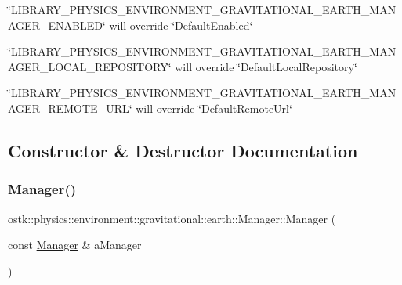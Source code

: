 \begin{DoxyItemize}
\item \char`\"{}\+L\+I\+B\+R\+A\+R\+Y\+\_\+\+P\+H\+Y\+S\+I\+C\+S\+\_\+\+E\+N\+V\+I\+R\+O\+N\+M\+E\+N\+T\+\_\+\+G\+R\+A\+V\+I\+T\+A\+T\+I\+O\+N\+A\+L\+\_\+\+E\+A\+R\+T\+H\+\_\+\+M\+A\+N\+A\+G\+E\+R\+\_\+\+E\+N\+A\+B\+L\+E\+D\char`\"{} will override \char`\"{}\+Default\+Enabled\char`\"{}
\item \char`\"{}\+L\+I\+B\+R\+A\+R\+Y\+\_\+\+P\+H\+Y\+S\+I\+C\+S\+\_\+\+E\+N\+V\+I\+R\+O\+N\+M\+E\+N\+T\+\_\+\+G\+R\+A\+V\+I\+T\+A\+T\+I\+O\+N\+A\+L\+\_\+\+E\+A\+R\+T\+H\+\_\+\+M\+A\+N\+A\+G\+E\+R\+\_\+\+L\+O\+C\+A\+L\+\_\+\+R\+E\+P\+O\+S\+I\+T\+O\+R\+Y\char`\"{} will override \char`\"{}\+Default\+Local\+Repository\char`\"{}
\item \char`\"{}\+L\+I\+B\+R\+A\+R\+Y\+\_\+\+P\+H\+Y\+S\+I\+C\+S\+\_\+\+E\+N\+V\+I\+R\+O\+N\+M\+E\+N\+T\+\_\+\+G\+R\+A\+V\+I\+T\+A\+T\+I\+O\+N\+A\+L\+\_\+\+E\+A\+R\+T\+H\+\_\+\+M\+A\+N\+A\+G\+E\+R\+\_\+\+R\+E\+M\+O\+T\+E\+\_\+\+U\+R\+L\char`\"{} will override \char`\"{}\+Default\+Remote\+Url\char`\"{} 
\end{DoxyItemize}

\subsection{Constructor \& Destructor Documentation}
\mbox{\label{classostk_1_1physics_1_1environment_1_1gravitational_1_1earth_1_1_manager_ac8ea6e08db0342132a14d071bd3f0107}} 
\subsubsection{\texorpdfstring{Manager()}{Manager()}}
{\footnotesize\ttfamily ostk\+::physics\+::environment\+::gravitational\+::earth\+::\+Manager\+::\+Manager (\begin{DoxyParamCaption}\item[{const \hyperlink{classostk_1_1physics_1_1environment_1_1gravitational_1_1earth_1_1_manager}{Manager} \&}]{a\+Manager }\end{DoxyParamCaption})\hspace{0.3cm}{\ttfamily [delete]}}




